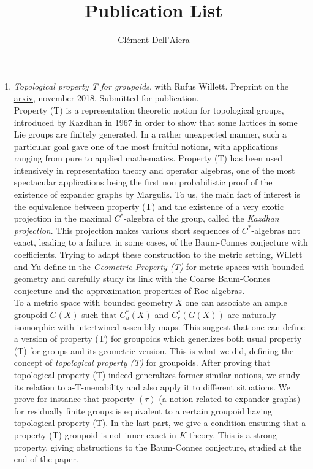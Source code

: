 \documentclass[a4paper]{article}
\title{Publication List}
\date{}
\author{ Clément Dell'Aiera}
\begin{document}
\maketitle

\begin{enumerate}
\item \textit{Topological property T for groupoids}, with Rufus Willett. Preprint on the \href{https://arxiv.org/abs/1811.07085}{arxiv}, november 2018. Submitted for publication.\\

Property (T) is a representation theoretic notion for topological groups, introduced by Kazdhan \cite{kazhdan} in 1967 in order to show that some lattices in some Lie groups are finitely generated. In a rather unexpected manner, such a particular goal gave one of the most fruitful notions, with applications ranging from pure to applied mathematics. Property (T) has been used intensively in representation theory and operator algebras, one of the most spectacular applications being the first non probabilistic proof of the existence of expander graphs by Margulis. To us, the main fact of interest is the equivalence between property (T) and the existence of a  very exotic projection in the maximal $C^*$-algebra of the group, called the \textit{Kazdhan projection}. This projection makes various short sequences of $C^*$-algebras not exact, leading to a failure, in some cases, of the Baum-Connes conjecture with coefficients. Trying to adapt these construction to the metric setting, Willett and Yu define in \cite{WillettYu} the \textit{Geometric Property (T)} for metric spaces with bounded geometry and carefully study its link with the Coarse Baum-Connes conjecture and the approximation properties of Roe algebras.\\

To a metric space with bounded geometry $X$ one can associate an ample groupoid $G(X)$ such that  $C^*_u(X)$ and $C_r^*(G(X))$ are naturally isomorphic with intertwined assembly maps. This suggest that one can define a version of property (T) for groupoids which generlizes both usual property (T) for groups and its geometric version. This is what we did, defining the concept of \textit{topological property (T)} for groupoids. After proving that topological property (T) indeed generalizes former similar notions, we study its relation to a-T-menability and also apply it to different situations. We prove for instance that property $(\tau)$ (a notion related to expander graphs) for residually finite groups is equivalent to a certain groupoid having topological property (T). In the last part, we give a condition ensuring that a property (T) groupoid is not inner-exact in $K$-theory. This is a strong property, giving obstructions to the Baum-Connes conjecture, studied at the end of the paper.


\end{enumerate}
\end{document}
